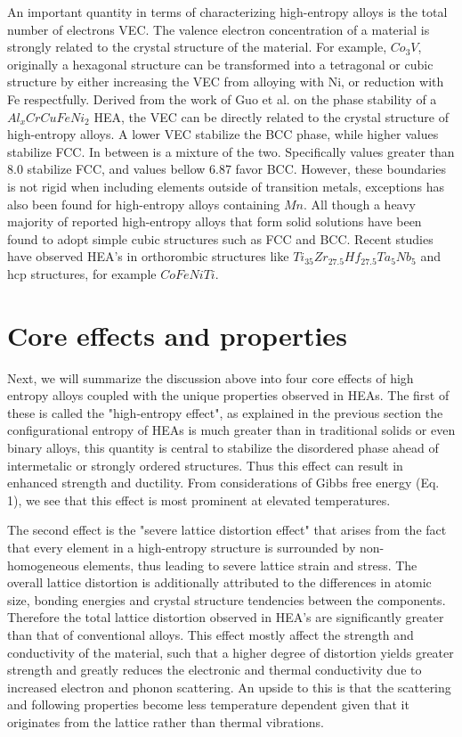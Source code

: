 An important quantity in terms of characterizing high-entropy alloys is the total number of electrons VEC. The valence electron concentration of a material is strongly related to the crystal structure of the material. For example, $Co_3V$, originally a hexagonal structure can be transformed into a tetragonal or cubic structure by either increasing the VEC from alloying with Ni, or reduction with Fe respectfully. Derived from the work of Guo et al. on the phase stability of a $Al_xCrCuFeNi_2$ HEA, the VEC can be directly related to the crystal structure of high-entropy alloys. A lower VEC stabilize the BCC phase, while higher values stabilize FCC. In between is a mixture of the two. Specifically values greater than 8.0 stabilize FCC, and values bellow 6.87 favor BCC. However, these boundaries is not rigid when including elements outside of transition metals, exceptions has also been found for high-entropy alloys containing $Mn$. All though a heavy majority of reported high-entropy alloys that form solid solutions have been found to adopt simple cubic structures such as FCC and BCC. Recent studies have observed HEA's in orthorombic structures like $Ti_{35}Zr_{27.5}Hf_{27.5}Ta_5Nb_5$ and hcp structures, for example $CoFeNiTi$.

\section{Core effects and properties}
Next, we will summarize the discussion above into four core effects of high entropy alloys coupled with the unique properties observed in HEAs. The first of these is called the "high-entropy effect", as explained in the previous section the configurational entropy of HEAs is much greater than in traditional solids or even binary alloys, this quantity is central to stabilize the disordered phase ahead of intermetalic or strongly ordered structures. Thus this effect can result in enhanced strength and ductility. From considerations of Gibbs free energy (Eq. 1), we see that this effect is most prominent at elevated temperatures.

The second effect is the "severe lattice distortion effect" that arises from the fact that every element in a high-entropy structure is surrounded by non-homogeneous elements, thus leading to severe lattice strain and stress. The overall lattice distortion is additionally attributed to the differences in atomic size, bonding energies and crystal structure tendencies between the components. Therefore the total lattice distortion observed in HEA's are significantly greater than that of conventional alloys. This effect mostly affect the strength and conductivity of the material, such that a higher degree of distortion yields greater strength and greatly reduces the electronic and thermal conductivity due to increased electron and phonon scattering. An upside to this is that the scattering and following properties become less temperature dependent given that it originates from the lattice rather than thermal vibrations.

